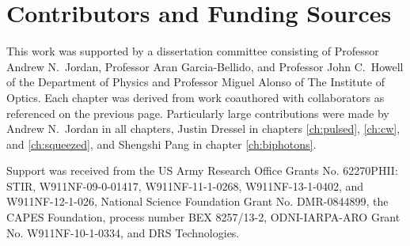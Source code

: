 \chapter*{Contributors and Funding Sources}

This work was supported by a dissertation committee consisting of Professor Andrew N.~Jordan, Professor Aran Garcia-Bellido, and Professor John C.~Howell of the Department of Physics and Professor Miguel Alonso of The Institute of Optics.  Each chapter was derived from work coauthored with collaborators as referenced on the previous page.  Particularly large contributions were made by Andrew N.~Jordan in all chapters, Justin Dressel in chapters \ref{ch:pulsed}, \ref{ch:cw}, and \ref{ch:squeezed}, and Shengshi Pang in chapter \ref{ch:biphotons}.

Support was received from the US Army Research Office Grants No. 62270PHII: STIR, W911NF-09-0-01417, W911NF-11-1-0268, W911NF-13-1-0402, and W911NF-12-1-026,  National Science Foundation Grant No. DMR-0844899, the CAPES Foundation, process number BEX 8257/13-2, ODNI-IARPA-ARO Grant No. W911NF-10-1-0334, and DRS Technologies. 

